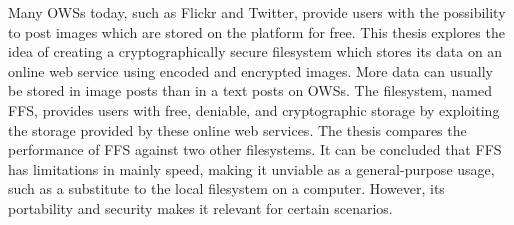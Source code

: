 




Many \gls{OWS}s today, such as Flickr and Twitter, provide users with the possibility to post images which are stored on the platform for free. This thesis explores the idea of creating a cryptographically secure filesystem which stores its data on an online web service using encoded and encrypted images. More data can usually be stored in image posts than in a text posts on \gls{OWS}s. The filesystem, named \gls{FFS}, provides users with free, deniable, and cryptographic storage by exploiting the storage provided by these online web services. The thesis compares the performance of \gls{FFS} against two other filesystems. It can be concluded that \gls{FFS} has limitations in mainly speed, making it unviable as a general-purpose usage, such as a substitute to the local filesystem on a computer. However, its portability and security makes it relevant for certain scenarios.
